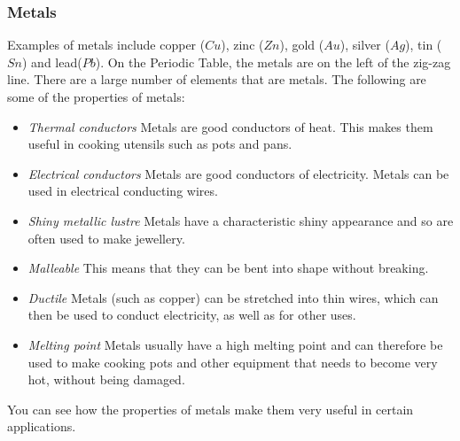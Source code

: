             \subsubsection{ Metals}
            \nopagebreak
        \label{m38708*id65726}Examples of metals include copper ($Cu$), zinc ($Zn$), gold ($Au$), silver ($Ag$), tin ($Sn$) and lead($Pb$). On the Periodic Table, the metals are on the left of the zig-zag line. There are a large number of elements that are metals. The following are some of the properties of metals:\par 
        \label{m38708*id65732}\begin{itemize}[noitemsep]
            \label{m38708*uid77}\item \textsl{Thermal conductors}
Metals are good conductors of heat. This makes them useful in cooking utensils such as pots and pans.
\label{m38708*uid78}\item \textsl{Electrical conductors}
Metals are good conductors of electricity. Metals can be used in electrical conducting wires.
\label{m38708*uid79}\item \textsl{Shiny metallic lustre}
Metals have a characteristic shiny appearance and so are often used to make jewellery.
\label{m38708*uid80}\item \textsl{Malleable}
This means that they can be bent into shape without breaking.
\label{m38708*uid81}\item \textsl{Ductile}
Metals (such as copper) can be stretched into thin wires, which can then be used to conduct electricity, as well as for other uses.
\label{m38708*uid82}\item \textsl{Melting point}
Metals usually have a high melting point and can therefore be used to make cooking pots and other equipment that needs to become very hot, without being damaged.
\end{itemize}
        \label{m38708*id65852}You can see how the properties of metals make them very useful in certain applications.\par 
\label{m38708*secfhsst!!!underscore!!!id320}
